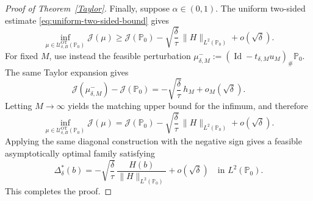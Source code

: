 \documentclass[11pt]{article}
\theoremstyle{definition}
\begin{document}
\begin{proof}[Proof of Theorem~\ref{Taylor}]
Finally, suppose $\alpha\in(0,1)$. The uniform two-sided estimate
\eqref{eq:uniform-two-sided-bound} gives
\[
\inf_{\mu\in
\mathcal U_{\delta,B}^{\mathrm{OT}}(\mathbb P_0)}
\mathcal J(\mu)
\ge
\mathcal J(\mathbb P_0)
-
\sqrt{\frac{\delta}{\tau}}\,
\|H\|_{L^2(\mathbb P_0)}
+
o(\sqrt{\delta}).
\]
For fixed $M$, use instead the feasible perturbation $\mu_{\delta,M}^{-}
:=
(\operatorname{Id}-t_{\delta,M}u_M)_\#
\mathbb P_0.$
The same Taylor expansion gives
\[
\mathcal J(\mu_{\delta,M}^{-})
-
\mathcal J(\mathbb P_0)
=
-
\sqrt{\frac{\delta}{\tau}}\,
h_M
+
o_M(\sqrt{\delta}).
\]
Letting $M\to\infty$ yields the matching upper bound for the infimum,
and therefore
\[
\inf_{\mu\in
\mathcal U_{\delta,B}^{\mathrm{OT}}(\mathbb P_0)}
\mathcal J(\mu)
=
\mathcal J(\mathbb P_0)
-
\sqrt{\frac{\delta}{\tau}}\,
\|H\|_{L^2(\mathbb P_0)}
+
o(\sqrt{\delta}).
\]
Applying the same diagonal construction with the negative sign gives a
feasible asymptotically optimal family satisfying
\[
\Delta_\delta^*(b)
=
-
\sqrt{\frac{\delta}{\tau}}\,
\frac{H(b)}
{\|H\|_{L^2(\mathbb P_0)}}
+
o(\sqrt{\delta})
\quad
\text{in }L^2(\mathbb P_0).
\]
This completes the proof.
\end{proof}
\end{document}

